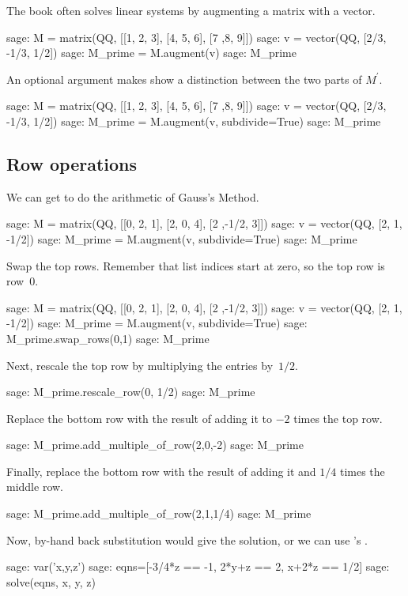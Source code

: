 The book often solves linear systems by augmenting a matrix with a vector.
\begin{sagecommandline}
sage: M = matrix(QQ, [[1, 2, 3], [4, 5, 6], [7 ,8, 9]])
sage: v = vector(QQ, [2/3, -1/3, 1/2])
sage: M_prime = M.augment(v)
sage: M_prime
\end{sagecommandline}
An optional argument makes 
\Sage{} show a distinction between the two parts 
of $M^\prime$.
\begin{sagecommandline}
sage: M = matrix(QQ, [[1, 2, 3], [4, 5, 6], [7 ,8, 9]])
sage: v = vector(QQ, [2/3, -1/3, 1/2])
sage: M_prime = M.augment(v, subdivide=True)
sage: M_prime                              
\end{sagecommandline}



\subsection{Row operations}
We can get \Sage{} to do the arithmetic of Gauss's Method.
\begin{sagecommandline}
sage: M = matrix(QQ, [[0, 2, 1], [2, 0, 4], [2 ,-1/2, 3]])
sage: v = vector(QQ, [2, 1, -1/2])                        
sage: M_prime = M.augment(v, subdivide=True)              
sage: M_prime                                             
\end{sagecommandline}
Swap the top rows. 
Remember that list indices start at zero,
so the top row is row~$0$.
\begin{sagecommandline}
sage: M = matrix(QQ, [[0, 2, 1], [2, 0, 4], [2 ,-1/2, 3]])
sage: v = vector(QQ, [2, 1, -1/2])                        
sage: M_prime = M.augment(v, subdivide=True)              
sage: M_prime.swap_rows(0,1)
sage: M_prime
\end{sagecommandline}
Next, rescale the top row by multiplying the entries by~$1/2$.
\begin{sagecommandline}
sage: M_prime.rescale_row(0, 1/2)
sage: M_prime
\end{sagecommandline}
Replace the bottom row with 
the result of adding it to  
$-2$ times the top row.
\begin{sagecommandline}
sage: M_prime.add_multiple_of_row(2,0,-2)
sage: M_prime
\end{sagecommandline}
Finally, replace the bottom row with the result of adding it and
$1/4$ times the middle row.
\begin{sagecommandline}
sage: M_prime.add_multiple_of_row(2,1,1/4)
sage: M_prime                             
\end{sagecommandline}
Now, by-hand back substitution would give the solution,
or we can use \Sage's .
\begin{sagecommandline}
sage: var('x,y,z')
sage: eqns=[-3/4*z == -1, 2*y+z == 2, x+2*z == 1/2]
sage: solve(eqns, x, y, z)
\end{sagecommandline}

